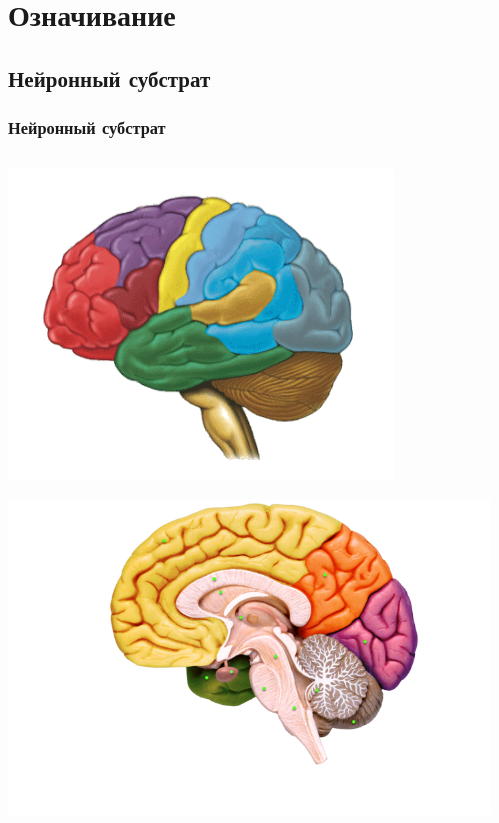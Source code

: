 \documentclass[default]{beamer}
\begin{document}
	\section{Означивание}
	\subsection{Нейронный субстрат}
	\begin{frame}
		\frametitle{Нейронный субстрат}
		
		\begin{columns}
			\begin{column}{0.35\textwidth}
				\includegraphics[width=0.8\textwidth]{phisio/mozg_2}
				\par\bigskip
				\hspace{-7mm}\includegraphics[width=\textwidth]{phisio/mozg}
			\end{column}
			\begin{column}{0.65\textwidth}

\end{column}
\end{columns}
\end{frame}
\end{document}
